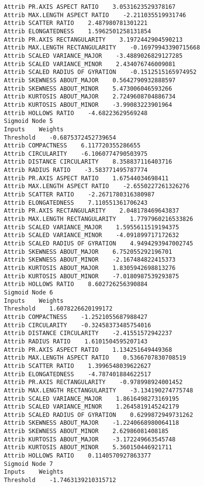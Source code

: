\documentclass[
	article,			%
	11pt,				%
	oneside,			%
	a4paper,			%
	english,			%
	brazil,				%
	sumario=tradicional
	]{abntex2}
\begin{document}
\begin{lstlisting}
Attrib PR.AXIS ASPECT RATIO    3.0531623529378167
Attrib MAX.LENGTH ASPECT RATIO    -2.211035519931746
Attrib SCATTER RATIO    2.487980781301221
Attrib ELONGATEDNESS    1.5962501258131854
Attrib PR.AXIS RECTANGULARITY    3.1972442904590213
Attrib MAX.LENGTH RECTANGULARITY    -0.16979943390715668
Attrib SCALED VARIANCE_MAJOR    -3.4889026829127285
Attrib SCALED VARIANCE_MINOR    2.434076746009081
Attrib SCALED RADIUS OF GYRATION    -0.1512515165974952
Attrib SKEWNESS ABOUT_MAJOR    0.5642790932888597
Attrib SKEWNESS ABOUT_MINOR    5.473006046593266
Attrib KURTOSIS ABOUT_MAJOR    2.7249608704886734
Attrib KURTOSIS ABOUT_MINOR    -3.99083223901964
Attrib HOLLOWS RATIO    -4.68223629569248
Sigmoid Node 5
Inputs    Weights
Threshold    -0.6875372452739654
Attrib COMPACTNESS    6.117720355286655
Attrib CIRCULARITY    -6.1060774790503975
Attrib DISTANCE CIRCULARITY    8.358837116403716
Attrib RADIUS RATIO    -3.583771495787774
Attrib PR.AXIS ASPECT RATIO    1.67544034698411
Attrib MAX.LENGTH ASPECT RATIO    -2.6550227261326276
Attrib SCATTER RATIO    -2.2671780316380987
Attrib ELONGATEDNESS    7.110551361706243
Attrib PR.AXIS RECTANGULARITY    2.048178469643837
Attrib MAX.LENGTH RECTANGULARITY    1.7797960216533826
Attrib SCALED VARIANCE_MAJOR    1.5955611519194375
Attrib SCALED VARIANCE_MINOR    -4.091899717172632
Attrib SCALED RADIUS OF GYRATION    4.9494293947002745
Attrib SKEWNESS ABOUT_MAJOR    6.752055292196701
Attrib SKEWNESS ABOUT_MINOR    -2.167484822415373
Attrib KURTOSIS ABOUT_MAJOR    1.8305942698813276
Attrib KURTOSIS ABOUT_MINOR    -7.0180987539293875
Attrib HOLLOWS RATIO    8.602726256390884
Sigmoid Node 6
Inputs    Weights
Threshold    1.6078226620199172
Attrib COMPACTNESS    -1.2521055687988427
Attrib CIRCULARITY    -0.32458373485754016
Attrib DISTANCE CIRCULARITY    -2.41551572942237
Attrib RADIUS RATIO    1.6101504595207143
Attrib PR.AXIS ASPECT RATIO    1.134251649449368
Attrib MAX.LENGTH ASPECT RATIO    0.5366707830708519
Attrib SCATTER RATIO    1.3996548039622627
Attrib ELONGATEDNESS    -4.787401884622517
Attrib PR.AXIS RECTANGULARITY    -0.978998924001452
Attrib MAX.LENGTH RECTANGULARITY    -3.134190274775748
Attrib SCALED VARIANCE_MAJOR    1.8616498273169195
Attrib SCALED VARIANCE_MINOR    1.2645819145242179
Attrib SCALED RADIUS OF GYRATION    0.6299872949731262
Attrib SKEWNESS ABOUT_MAJOR    -1.2240668980064118
Attrib SKEWNESS ABOUT_MINOR    2.62986081408185
Attrib KURTOSIS ABOUT_MAJOR    -3.172249663545748
Attrib KURTOSIS ABOUT_MINOR    5.360150446921711
Attrib HOLLOWS RATIO    0.1140570927863377
Sigmoid Node 7
Inputs    Weights
Threshold    -1.7463139210315712

\end{lstlisting}
\end{document}
